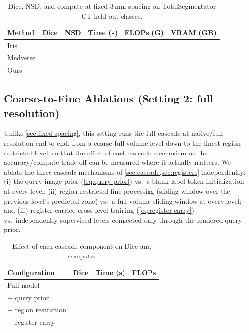 \begin{table}[t]
\centering
\caption{Dice, NSD, and compute at fixed 3\,mm spacing on
TotalSegmentator CT held-out classes. }
\label{tab:fixed-spacing}
\small
\begin{tabular}{@{}lccccc@{}}
\toprule
Method & Dice & NSD & Time (s) & FLOPs (G) & VRAM (GB) \\
\midrule
Iris & \TODO{} & \TODO{} & \TODO{} & \TODO{} & \TODO{} \\
Medverse & \TODO{} & \TODO{} & \TODO{} & \TODO{} & \TODO{} \\
Ours & \TODO{} & \TODO{} & \TODO{} & \TODO{} & \TODO{} \\
\bottomrule
\end{tabular}
\end{table}


\subsection{Coarse-to-Fine Ablations (Setting 2: full resolution)}
\label{sec:c2f-ablation}

Unlike \cref{sec:fixed-spacing}, this setting runs the full cascade at
native/full resolution end to end, from a coarse full-volume level down
to the finest region-restricted level, so that the effect of each cascade
mechanism on the accuracy/compute trade-off can be measured where it
actually matters. We ablate the three cascade mechanisms of
\cref{sec:cascade,sec:registers} independently: (i) the query image prior
(\cref{eq:query-prior}) vs.\ a blank label-token initialization at every
level; (ii) region-restricted fine processing (sliding window over the
previous level's predicted zone) vs.\ a full-volume sliding window at
every level; and (iii) register-carried cross-level training
(\cref{eq:register-carry}) vs.\ independently-supervised levels
connected only through the rendered query prior.

\label{sec:cross-level-ablation}
\begin{table}[t]
\centering
\caption{Effect of each cascade component on Dice and compute.
}
\label{tab:c2f-ablation}
\small
\begin{tabular}{@{}lccc@{}}
\toprule
Configuration & Dice & Time (s) & FLOPs \\
\midrule
Full model & \TODO{} & \TODO{} & \TODO{} \\
$-$ query prior & \TODO{} & \TODO{} & \TODO{} \\
$-$ region restriction & \TODO{} & \TODO{} & \TODO{} \\
$-$ register carry & \TODO{} & \TODO{} & \TODO{} \\
\bottomrule
\end{tabular}
\end{table}

